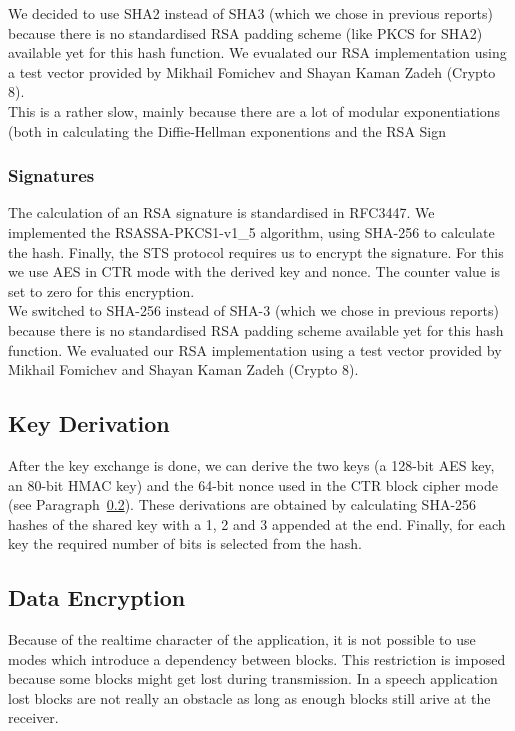 \documentclass[a4paper]{article}
\begin{document}
We decided to use SHA2 instead of SHA3 (which we chose in previous reports) because there is no standardised RSA padding scheme (like PKCS for SHA2) available yet for this hash function. We evualated our RSA implementation using a test vector provided by Mikhail Fomichev and Shayan Kaman Zadeh (Crypto 8).\\

This is a rather slow, mainly because there are a lot of modular exponentiations (both in calculating the Diffie-Hellman exponentions and the RSA Sign

\subsubsection{Signatures}

The calculation of an RSA signature is standardised in RFC3447. We implemented the RSASSA-PKCS1-v1\_5 algorithm, using SHA-256 to calculate the hash. Finally, the STS protocol requires us to encrypt the signature. For this we use AES in CTR mode with the derived key and nonce. The counter value is set to zero for this encryption.\\

We switched to SHA-256 instead of SHA-3 (which we chose in previous reports) because there is no standardised RSA padding scheme available yet for this hash function. We evaluated our RSA implementation using a test vector provided by Mikhail Fomichev and Shayan Kaman Zadeh (Crypto 8).

\subsection{Key Derivation}
\label{par:key_derivation}

After the key exchange is done, we can derive the two keys (a 128-bit AES key, an 80-bit HMAC key) and the 64-bit nonce used in the CTR block cipher mode (see Paragraph~\ref{par:data_encryption}). These derivations are obtained by calculating SHA-256 hashes of the shared key with a 1, 2 and 3 appended at the end. Finally, for each key the required number of bits is selected from the hash.

\subsection{Data Encryption}
\label{par:data_encryption}

Because of the realtime character of the application, it is not possible to use modes which introduce a dependency between blocks. This restriction is imposed because some blocks might get lost during transmission. In a speech application lost blocks are not really an obstacle as long as enough blocks still arive at the receiver.\\
\end{document}

